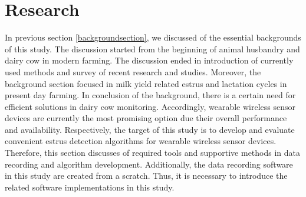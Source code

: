 \documentclass[english,12pt,a4paper,pdftex,elec,utf8]{aaltothesis}
\begin{document}
\clearpage

\section{Research} \label{researchsection}

In previous section \ref{backgroundsection}, we discussed of the essential backgrounds of this study. The discussion started from the beginning of animal husbandry and dairy cow in modern farming. The discussion ended in introduction of currently used methods and survey of recent research and studies. Moreover, the background section focused in milk yield related estrus and lactation cycles in present day farming. In conclusion of the background, there is a certain need for efficient solutions in dairy cow monitoring. Accordingly, wearable wireless sensor devices are currently the most promising option due their overall performance and availability. Respectively, the target of this study is to develop and evaluate convenient estrus detection algorithms for wearable wireless sensor devices. Therefore, this section discusses of required tools and supportive methods in data recording and algorithm development. Additionally, the data recording software in this study are created from a scratch. Thus, it is necessary to introduce the related software implementations in this study.
\end{document}

